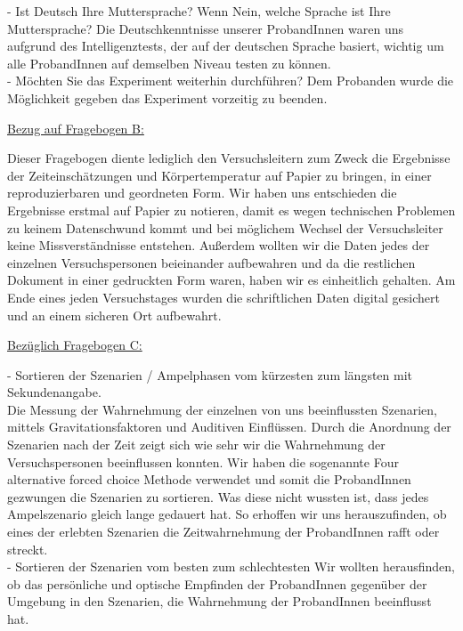 \documentclass{Bericht}
\begin{document}
- Ist Deutsch Ihre Muttersprache? Wenn Nein, welche Sprache ist Ihre Muttersprache?
Die Deutschkenntnisse unserer ProbandInnen waren uns aufgrund des Intelligenztests, der auf der deutschen Sprache basiert, wichtig um alle ProbandInnen auf demselben Niveau testen zu können.  \\

- Möchten Sie das Experiment weiterhin durchführen?
Dem Probanden wurde die Möglichkeit gegeben das Experiment vorzeitig zu beenden. 

\underline{Bezug auf  \glqq Fragebogen B\grqq{}:} 

Dieser Fragebogen diente lediglich den Versuchsleitern zum Zweck die Ergebnisse der Zeiteinschätzungen und Körpertemperatur auf Papier zu bringen, in einer reproduzierbaren und geordneten Form. Wir haben uns entschieden die Ergebnisse erstmal auf Papier zu notieren, damit es wegen technischen Problemen zu keinem Datenschwund kommt und bei möglichem Wechsel der Versuchsleiter keine Missverständnisse entstehen. Außerdem wollten wir die Daten jedes der einzelnen Versuchspersonen beieinander aufbewahren und da die restlichen Dokument in einer gedruckten Form waren, haben wir es einheitlich gehalten. Am Ende eines jeden Versuchstages wurden die schriftlichen Daten digital gesichert und an einem sicheren Ort aufbewahrt.

\underline{Bezüglich  \glqq Fragebogen C\grqq{}:}

- Sortieren der Szenarien / Ampelphasen vom kürzesten zum längsten mit Sekundenangabe. \\
Die Messung der Wahrnehmung der einzelnen von uns beeinflussten Szenarien, mittels Gravitationsfaktoren und Auditiven Einflüssen. Durch die Anordnung der Szenarien nach der Zeit zeigt sich wie sehr wir die Wahrnehmung der Versuchspersonen beeinflussen konnten.  Wir haben die sogenannte \glqq Four alternative forced choice\grqq{} Methode verwendet und somit die ProbandInnen \glqq gezwungen\grqq{} die Szenarien zu sortieren. Was diese nicht wussten ist, dass jedes Ampelszenario gleich lange gedauert hat. So erhoffen wir uns herauszufinden, ob eines der erlebten Szenarien die Zeitwahrnehmung der ProbandInnen rafft oder streckt. \\

- Sortieren der Szenarien vom besten zum schlechtesten
Wir wollten herausfinden, ob das persönliche und optische Empfinden der ProbandInnen gegenüber der Umgebung in den Szenarien, die Wahrnehmung der ProbandInnen beeinflusst hat. \\
\end{document}
